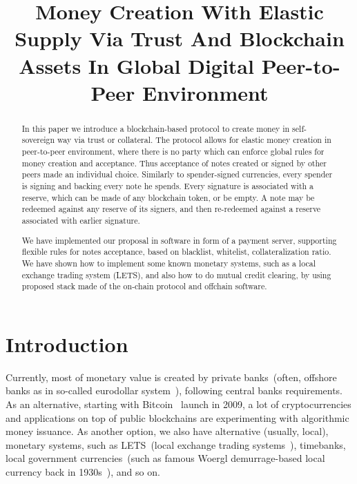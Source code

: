 \documentclass{llncs}   %
\begin{document}
\title{Money Creation With Elastic Supply Via Trust And Blockchain Assets In
Global Digital Peer-to-Peer Environment}



\maketitle

\begin{abstract}
In this paper we introduce a blockchain-based protocol to create money in self-sovereign way via trust or collateral. The
protocol allows for elastic money creation in peer-to-peer environment, where there is no party which can enforce global
rules for money creation and acceptance. Thus acceptance of notes created or signed
by other peers made an individual choice. Similarly to spender-signed currencies, every spender is signing and backing every
note he spends. Every signature is associated with a reserve, which can be made of any blockchain token, or be empty. A note may
be redeemed against any reserve of its signers, and then re-redeemed against a reserve associated with earlier signature.

We have implemented our proposal in software in form of a payment server, supporting flexible rules for notes acceptance,
based on blacklist, whitelist, collateralization ratio. We have shown how to implement some known monetary systems, such as
a local exchange trading system (LETS), and also how to do mutual credit clearing, by using proposed stack made of the on-chain protocol
 and offchain software.
\end{abstract}

\section{Introduction}

Currently, most of monetary value is created by private banks~(often, offshore banks as in so-called eurodollar
system~\cite{machlup1970euro}), following central banks requirements. As an alternative, starting with
Bitcoin~\cite{nakamoto2008peer} launch in 2009, a lot of cryptocurrencies and applications on top of public
blockchains are experimenting with algorithmic money issuance. As another option, we also have alternative (usually, local),
monetary systems, such as LETS~(local exchange trading systems~\cite{williams1996new}), timebanks, local government
currencies~(such as famous Woergl demurrage-based local currency back in 1930s~\cite{unterguggenbercer1934end}), and so on.
\end{document}
